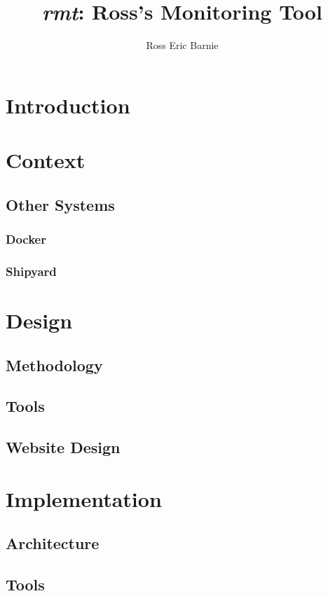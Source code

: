 \documentclass{l4proj}
\title{\emph{rmt}: Ross's Monitoring Tool}
\author{Ross Eric Barnie}
\begin{document}
\maketitle
\tableofcontents



\chapter{Introduction}


\chapter{Context}
\section{Other Systems}
\subsection{Docker}

\subsection{Shipyard}


\chapter{Design}
\section{Methodology}

\section{Tools}

\section{Website Design}


\chapter{Implementation}
\section{Architecture}

\section{Tools}

\end{document}
